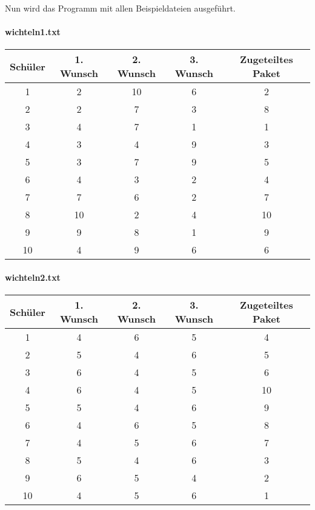 \documentclass[a4paper,10pt,ngerman]{scrartcl}
\begin{document}
Nun wird das Programm mit allen Beispieldateien ausgeführt.

\paragraph{wichteln1.txt}
\begin{longtable}[c]{c|c|c|c|c}
    Schüler & 1. Wunsch & 2. Wunsch & 3. Wunsch & Zugeteiltes Paket \\
    \hline
    \endhead
    1 & 2 & 10 & 6 & 2 \\
    2 & 2 & 7 & 3 & 8 \\
    3 & 4 & 7 & 1 & 1 \\
    4 & 3 & 4 & 9 & 3 \\
    5 & 3 & 7 & 9 & 5 \\
    6 & 4 & 3 & 2 & 4 \\
    7 & 7 & 6 & 2 & 7 \\
    8 & 10 & 2 & 4 & 10 \\
    9 & 9 & 8 & 1 & 9 \\
    10 & 4 & 9 & 6 & 6
\end{longtable}

\paragraph{wichteln2.txt}
\begin{longtable}[c]{c|c|c|c|c}
    Schüler & 1. Wunsch & 2. Wunsch & 3. Wunsch & Zugeteiltes Paket \\
    \hline
    \endhead
    1 & 4 & 6 & 5 & 4 \\
    2 & 5 & 4 & 6 & 5 \\
    3 & 6 & 4 & 5 & 6 \\
    4 & 6 & 4 & 5 & 10 \\
    5 & 5 & 4 & 6 & 9 \\
    6 & 4 & 6 & 5 & 8 \\
    7 & 4 & 5 & 6 & 7 \\
    8 & 5 & 4 & 6 & 3 \\
    9 & 6 & 5 & 4 & 2 \\
    10 & 4 & 5 & 6 & 1
\end{longtable}
\end{document}
